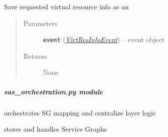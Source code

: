 \documentclass[letterpaper,10pt,english]{sphinxmanual}
\begin{document}
\begin{fulllineitems}
\begin{fulllineitems}
\begin{quote}
\begin{description}
\end{description}\end{quote}

\end{fulllineitems}


\begin{fulllineitems}
\label{service/sas_API:escape.service.sas_API.ServiceLayerAPI._handle_VirtResInfoEvent}
Save requested virtual resource info as an {\hyperref[orchest/virtualization_mgmt:escape.orchest.virtualization_mgmt.ESCAPEVirtualizer]{\emph{}}}
\begin{quote}\begin{description}
\item[{Parameters}] \leavevmode
\textbf{\texttt{event}} ({\hyperref[orchest/ros_API:escape.orchest.ros_API.VirtResInfoEvent]{\emph{\emph{VirtResInfoEvent}}}}) -- event object

\item[{Returns}] \leavevmode
None

\end{description}\end{quote}

\end{fulllineitems}


\begin{fulllineitems}
\label{service/sas_API:escape.service.sas_API.ServiceLayerAPI._handle_InstantiationFinishedEvent}
\end{fulllineitems}


\end{fulllineitems}



\subparagraph{\emph{sas\_orchestration.py} module}
\label{service/sas_orchestration:sas-orchestration-py-module}\label{service/sas_orchestration::doc}
{\hyperref[service/sas_orchestration:escape.service.sas_orchestration.ServiceOrchestrator]{\emph{}}} orchestrates SG mapping and centralize layer logic

{\hyperref[service/sas_orchestration:escape.service.sas_orchestration.SGManager]{\emph{}}} stores and handles Service Graphs
\end{document}
